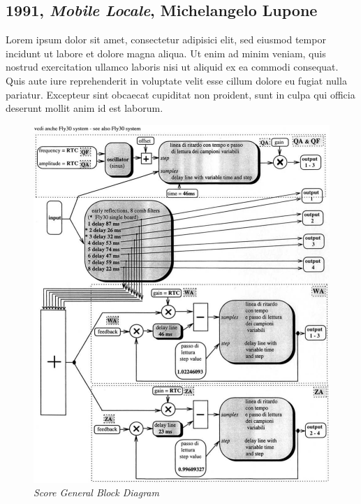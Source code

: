 \documentclass[twoside,a4paper]{article}
\begin{document}

\subsection{1991, \emph{Mobile Locale}, Michelangelo Lupone}

Lorem ipsum dolor sit amet, consectetur adipisici elit, sed eiusmod tempor
incidunt ut labore et dolore magna aliqua. Ut enim ad minim veniam, quis
nostrud exercitation ullamco laboris nisi ut aliquid ex ea commodi consequat.
Quis aute iure reprehenderit in voluptate velit esse cillum dolore eu fugiat
nulla pariatur. Excepteur sint obcaecat cupiditat non proident, sunt in culpa
qui officia deserunt mollit anim id est laborum.

\begin{figure}[ht]
\centerline{\includegraphics[scale=0.5]{img/1-comp}}
\caption{\label{ml-gen-dia}{\it Score General Block Diagram}}
\end{figure}
\end{document}

